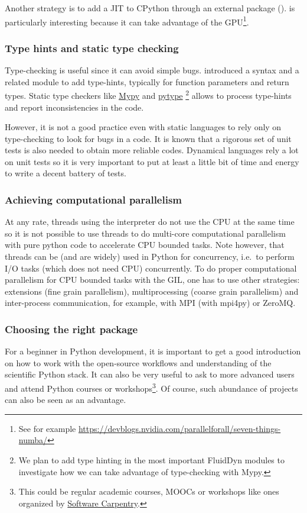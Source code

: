 Another strategy is to add a JIT to CPython through an external package
().
%
 is particularly interesting because it can take advantage of the
GPU\footnote{See for example
\url{https://devblogs.nvidia.com/parallelforall/seven-things-numba/}}.


\subsubsection{Type hints and static type checking}
%
Type-checking is useful since it can avoid simple bugs.
introduced a syntax and a related  module to add
type-hints, typically for function parameters and return types.
%
Static type checkers like \href{http://mypy-lang.org/}{Mypy} and
\href{https://github.com/google/pytype}{pytype}
%
\footnote{We plan to add type hinting in the most important FluidDyn modules to
investigate how we can take advantage of type-checking with Mypy.}
%
allows to process type-hints and report inconsistencies in the code.

However, it is not a good practice even with static languages to rely only on
type-checking to look for bugs in a code.
%
It is known that a rigorous set of unit tests is also needed to obtain more
reliable codes.
%
Dynamical languages rely a lot on unit tests so it is very important to put at
least a little bit of time and energy to write a decent battery of tests.

\subsubsection{Achieving computational parallelism}

At any rate, threads using the interpreter do not use the CPU at the same time
so it is not possible to use threads to do multi-core computational parallelism
with pure python code to accelerate CPU bounded tasks.
%
Note however, that threads can be (and are widely) used in Python for
concurrency, i.e.\ to perform I/O tasks (which does not need CPU) concurrently.
%
To do proper computational parallelism for CPU bounded tasks with the GIL, one
has to use other strategies: extensions (fine grain parallelism),
multiprocessing (coarse grain parallelism) and inter-process communication, for
example, with MPI (with mpi4py) or ZeroMQ.

\subsubsection{Choosing the right package}
%
For a beginner in Python development, it is important to get a good
introduction on how to work with the open-source workflows and understanding of
the scientific Python stack.
%
It can also be very useful to ask to more advanced users and attend Python
courses or workshops\footnote{This could be regular academic courses, MOOCs or
workshops like ones organized by
\href{https://software-carpentry.org/}{Software Carpentry}.}.
%
Of course, such abundance of projects can also be seen as an advantage.


